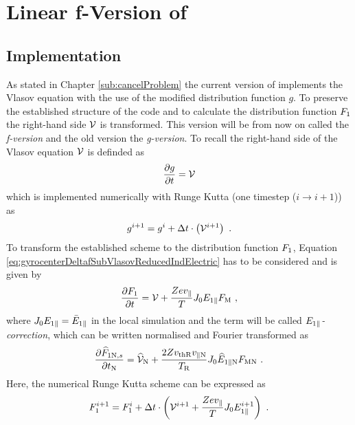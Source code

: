 \section{Linear f-Version of {\gkw}}
\label{sec:simLinearFVersion}

\subsection{Implementation}
\label{sub:implementationLinearFVersion}

As stated in Chapter \ref{sub:cancelProblem} the current version of {\gkw} implements the Vlasov equation with the use of the modified distribution function $g$. To preserve the established structure of the code and to calculate the distribution function $F_1$ the right-hand side $\mathcal{V}$ is transformed. This version will be from now on called the \textit{f-version} and the old version the \textit{g-version}. To recall the right-hand side of the Vlasov equation $\mathcal{V}$ is definded as
\begin{gather}
    \frac{\partial g}{\partial t} = \mathcal{V}
    \label{eq:rightHandSideRecall}
\end{gather}
which is implemented numerically with Runge Kutta (one timestep ($i \rightarrow i+1$)) as
\begin{gather}
    g^{i+1} = g^{i} + \Delta t \cdot \left(\mathcal{V}^{i+1}\right) ~.
    \label{eq:numericalSchemeModifiedDistribution}
\end{gather}
To transform the established scheme to the distribution function $F_1$, Equation \ref{eq:gyrocenterDeltafSubVlasovReducedIndElectric} has to be considered and is given by
\begin{gather}
    \frac{\partial F_1}{\partial t} = \mathcal{V} + \frac{Ze v_\parallel}{T} J_0 E_{1\parallel} F_\mathrm{M}~,
    \label{eq:gyrocenterDeltafSubVlasovReducedIndElectricRecall}
\end{gather}
where $J_0 E_{1\parallel} = \bar{E}_{1\parallel}$ in the local simulation and the term will be called \textit{$E_{1\parallel}$-correction}, which can be written normalised and Fourier transformed as 
\begin{gather}
    \frac{\partial \widehat{F}_{1\mathrm{N},s}}{\partial t_\mathrm{N}} = \widehat{\mathcal{V}}_\mathrm{N} + \frac{2 Z v_{\mathrm{th} \mathrm{R}} v_{\parallel \mathrm{N}}}{T_\mathrm{R}} J_0 \widehat{E}_{1\parallel \mathrm{N}} F_{\mathrm{M} \mathrm{N}}~.
    \label{eq:gyrocenterDeltafSubVlasovReducedIndElectricNorm}
\end{gather}
Here, the numerical Runge Kutta scheme can be expressed as
\begin{gather}
    F_1^{i+1} = F_1^{i} + \Delta t \cdot \left(\mathcal{V}^{i+1} + \frac{Ze v_\parallel}{T} J_0 E_{1\parallel}^{i+1} \right) ~.
    \label{eq:numericalSchemeModifiedDistribution}
\end{gather}
